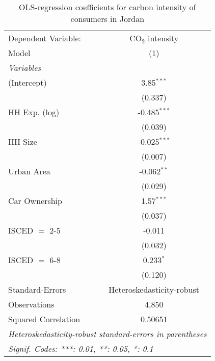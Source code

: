 
\begin{table}[htbp!]
   \centering
   \small
   \begin{adjustbox}{width = 1\textwidth, max height = 0.95\textheight, center}
      \begin{threeparttable}[b]
         \caption{\label{tab:OLS_1_JOR} OLS-regression coefficients for carbon intensity of consumers in Jordan}
         \begin{tabular}{lc}
            \tabularnewline \midrule \midrule
            Dependent Variable: & CO$_{2}$ intensity\\  
            Model               & (1)\\  
            \midrule
            \emph{Variables}\\
            (Intercept)         & 3.85$^{***}$\\   
                                & (0.337)\\   
            HH Exp. (log)       & -0.485$^{***}$\\   
                                & (0.039)\\   
            HH Size             & -0.025$^{***}$\\   
                                & (0.007)\\   
            Urban Area          & -0.062$^{**}$\\   
                                & (0.029)\\   
            Car Ownership       & 1.57$^{***}$\\   
                                & (0.037)\\   
            ISCED $=$ 2-5       & -0.011\\   
                                & (0.032)\\   
            ISCED $=$ 6-8       & 0.233$^{*}$\\   
                                & (0.120)\\   
            \midrule 
            Standard-Errors     & Heteroskedasticity-robust \\   
            Observations        & 4,850\\  
            Squared Correlation & 0.50651\\  
            \midrule \midrule
            \multicolumn{2}{l}{\emph{Heteroskedasticity-robust standard-errors in parentheses}}\\
            \multicolumn{2}{l}{\emph{Signif. Codes: ***: 0.01, **: 0.05, *: 0.1}}\\
         \end{tabular}
         

\end{threeparttable}
\end{adjustbox}
\end{table}
